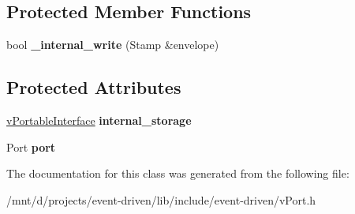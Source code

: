 \subsection*{Protected Member Functions}
\begin{DoxyCompactItemize}
\item 
\mbox{\label{classev_1_1vWritePort_a05c3debed09851bd024782ca0e4a7b54}} 
bool {\bfseries \+\_\+internal\+\_\+write} (Stamp \&envelope)
\end{DoxyCompactItemize}
\subsection*{Protected Attributes}
\begin{DoxyCompactItemize}
\item 
\mbox{\label{classev_1_1vWritePort_af9ffcc74c80d4c04f2447c718c52f270}} 
\hyperlink{classev_1_1vPortableInterface}{v\+Portable\+Interface} {\bfseries internal\+\_\+storage}
\item 
\mbox{\label{classev_1_1vWritePort_a0cb1d83ab6473e736660b9e95a5e35b9}} 
Port {\bfseries port}
\end{DoxyCompactItemize}


The documentation for this class was generated from the following file\+:\begin{DoxyCompactItemize}
\item 
/mnt/d/projects/event-\/driven/lib/include/event-\/driven/v\+Port.\+h\end{DoxyCompactItemize}
